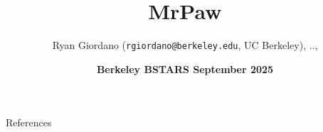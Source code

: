 \documentclass[8pt]{beamer}\usepackage[]{graphicx}\usepackage[]{color}
\title{MrPaw}
\author{Ryan Giordano (\texttt{rgiordano@berkeley.edu}, UC Berkeley), ..,}
\date{\textbf{Berkeley BSTARS September 2025}}
\begin{document}
\maketitle








\begin{frame}{References}

\footnotesize


\begingroup
\renewcommand{\section}[2]{}%

\endgroup

\end{frame}
\end{document}
